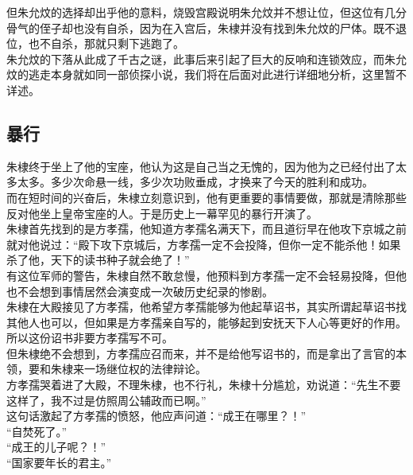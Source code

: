 \begin{multicols}{\theparacolNo}
但朱允炆的选择却出乎他的意料，烧毁宫殿说明朱允炆并不想让位，但这位有几分骨气的侄子却也没有自杀，因为在入宫后，朱棣并没有找到朱允炆的尸体。既不退位，也不自杀，那就只剩下逃跑了。\\

朱允炆的下落从此成了千古之谜，此事后来引起了巨大的反响和连锁效应，而朱允炆的逃走本身就如同一部侦探小说，我们将在后面对此进行详细地分析，这里暂不详述。\\

\subsection{暴行}
朱棣终于坐上了他的宝座，他认为这是自己当之无愧的，因为他为之已经付出了太多太多。多少次命悬一线，多少次功败垂成，才换来了今天的胜利和成功。\\

而在短时间的兴奋后，朱棣立刻意识到，他有更重要的事情要做，那就是清除那些反对他坐上皇帝宝座的人。于是历史上一幕罕见的暴行开演了。\\

朱棣首先找到的是方孝孺，他知道方孝孺名满天下，而且道衍早在他攻下京城之前就对他说过：“殿下攻下京城后，方孝孺一定不会投降，但你一定不能杀他！如果杀了他，天下的读书种子就会绝了！”\\

有这位军师的警告，朱棣自然不敢怠慢，他预料到方孝孺一定不会轻易投降，但他也不会想到事情居然会演变成一次破历史纪录的惨剧。\\

朱棣在大殿接见了方孝孺，他希望方孝孺能够为他起草诏书，其实所谓起草诏书找其他人也可以，但如果是方孝孺亲自写的，能够起到安抚天下人心等更好的作用。所以这份诏书非要方孝孺写不可。\\

但朱棣绝不会想到，方孝孺应召而来，并不是给他写诏书的，而是拿出了言官的本领，要和朱棣来一场继位权的法律辩论。\\

方孝孺哭着进了大殿，不理朱棣，也不行礼，朱棣十分尴尬，劝说道：“先生不要这样了，我不过是仿照周公辅政而已啊。”\\

这句话激起了方孝孺的愤怒，他应声问道：“成王在哪里？！”\\

“自焚死了。”\\

“成王的儿子呢？！”\\

“国家要年长的君主。”\\


\end{multicols}
